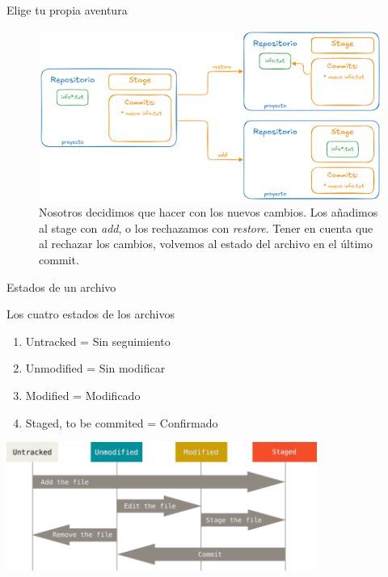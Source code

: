 \begin{frame}{Elige tu propia aventura}
\begin{figure}
    \centering
    \includegraphics[width=0.99\linewidth]{graficos/restore-add.png}
    \caption{Nosotros decidimos que hacer con los nuevos cambios.
    Los añadimos al stage con \textit{add}, o los rechazamos con \textit{restore}. Tener en cuenta que al rechazar los cambios, volvemos al estado del archivo en el último commit.}
\end{figure}  
\end{frame}

\begin{frame}{Estados de un archivo}

    \begin{block}{Los cuatro estados de los archivos}
            \begin{enumerate}
    \item Untracked = Sin seguimiento
    \item Unmodified = Sin modificar
    \item Modified = Modificado
    \item Staged, to be commited = Confirmado
    \end{enumerate}
    \end{block}
    \begin{center}
        \includegraphics[width=4in]{images/lifecycle.png}
    \end{center}    
\end{frame}

